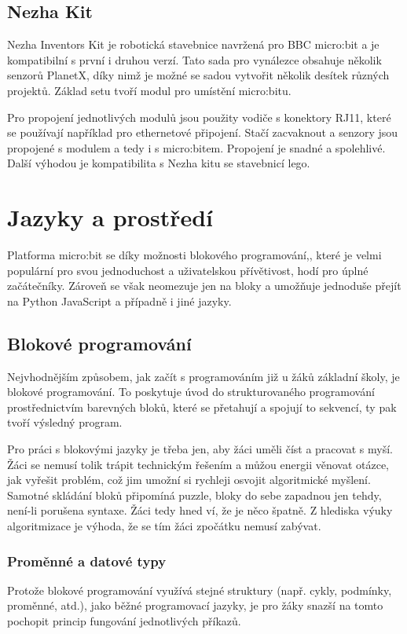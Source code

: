 \documentclass[
  digital,     %
  oneside,     %
  nosansbold,  %
  nocolorbold, %
  lof,         %
  lot,         %
]{fithesis4}
\begin{document}
\subsection{Nezha Kit}
Nezha Inventors Kit je robotická stavebnice navržená pro BBC micro:bit a je kompatibilní s první i druhou verzí. Tato sada pro vynálezce obsahuje několik senzorů PlanetX, díky nimž je možné se sadou vytvořit několik desítek různých projektů. Základ setu tvoří modul pro umístění micro:bitu. 

Pro propojení jednotlivých modulů jsou použity vodiče s konektory RJ11, které se používají například pro ethernetové připojení. Stačí zacvaknout a senzory jsou propojené s modulem a tedy i s micro:bitem. Propojení je snadné a spolehlivé. Další výhodou je kompatibilita s Nezha kitu se stavebnicí lego.

\section{Jazyky a prostředí}
Platforma micro:bit se díky možnosti blokového programování,, které je velmi populární pro svou jednoduchost a uživatelskou přívětivost, hodí pro úplné začátečníky. Zároveň se však neomezuje jen na bloky a umožňuje jednoduše přejít na Python JavaScript a případně i jiné jazyky.

\subsection{Blokové programování}
Nejvhodnějším způsobem, jak začít s programováním již u žáků základní školy, je blokové programování. To poskytuje úvod do strukturovaného programování prostřednictvím barevných bloků, které se přetahují a spojují to sekvencí, ty pak tvoří výsledný program.

Pro práci s blokovými jazyky je třeba jen, aby žáci uměli číst a pracovat s myší. Žáci se nemusí tolik trápit technickým řešením a můžou energii věnovat otázce, jak vyřešit problém, což jim umožní si rychleji osvojit algoritmické myšlení. Samotné skládání bloků připomíná puzzle, bloky do sebe zapadnou jen tehdy, není-li porušena syntaxe. Žáci tedy hned ví, že je něco špatně. Z hlediska výuky algoritmizace je výhoda, že se tím žáci zpočátku nemusí zabývat.

\subsubsection{Proměnné a datové typy}
Protože blokové programování využívá stejné struktury (např. cykly, podmínky, proměnné, atd.), jako běžné programovací jazyky, je pro žáky snazší na tomto pochopit princip fungování jednotlivých příkazů. 
\end{document}
